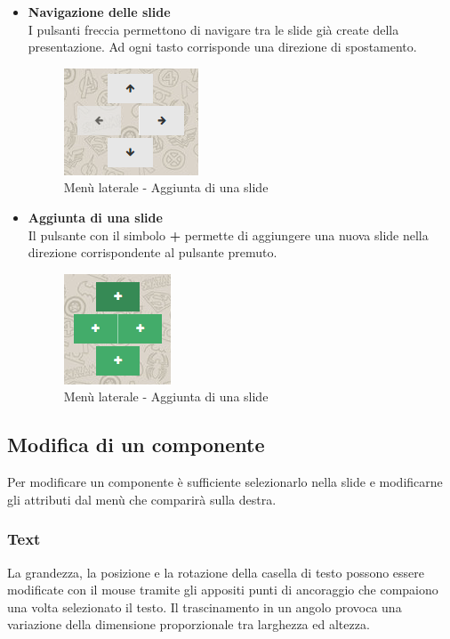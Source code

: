 \begin{itemize}
  \item \textbf{Navigazione delle slide}\\
  I pulsanti freccia permettono di navigare tra le slide già create della presentazione. Ad ogni tasto corrisponde una direzione di spostamento.
  \begin{figure}[h] 
  	\centering 
  	\includegraphics[scale=0.80] {img/editor_move.png}
  	\caption{Menù laterale - Aggiunta di una slide} 
  \end{figure}
 
 
 
\item \textbf{Aggiunta di una slide}\\
 Il pulsante con il simbolo \textbf{+} permette di aggiungere una nuova slide nella direzione corrispondente al pulsante premuto.
 \begin{figure}[h] 
 	\centering 
 	\includegraphics[scale=0.80] {img/editor_add.png}
 	\caption{Menù laterale - Aggiunta di una slide} 
 \end{figure}

\end{itemize}


\newpage

\subsection{Modifica di un componente}
Per modificare un componente è sufficiente selezionarlo nella slide e modificarne gli attributi dal menù che comparirà sulla destra.

\subsubsection{Text}
La grandezza, la posizione e la rotazione della casella di testo possono essere modificate con il mouse tramite gli appositi punti di ancoraggio che compaiono una volta selezionato il testo. Il trascinamento in un angolo provoca una variazione della dimensione proporzionale tra larghezza ed altezza.

